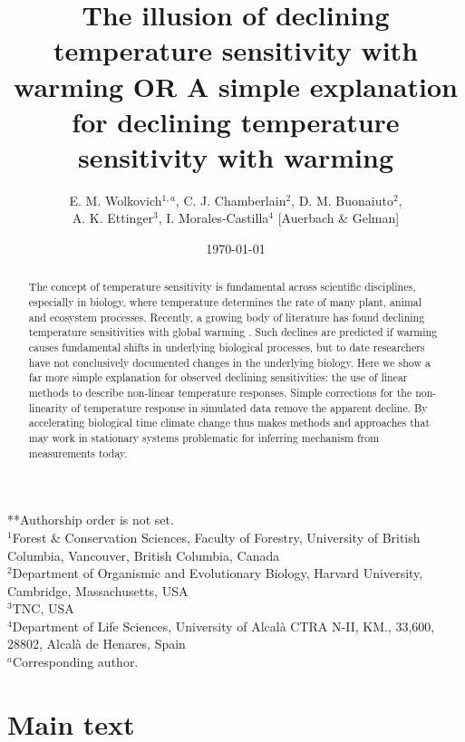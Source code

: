 \documentclass[11pt,letter]{article}
\begin{document}
\title{The illusion of declining temperature sensitivity with warming OR A simple explanation for declining temperature sensitivity with warming} %
\author{E. M. Wolkovich$^{1,a}$, C. J. Chamberlain$^{2}$, D. M. Buonaiuto$^{2}$, \\ A. K. Ettinger$^3$, I. Morales-Castilla$^{4}$ [Auerbach \& Gelman]} %

\date{\today} 
\maketitle
**Authorship order is not set.\\
$^1$Forest \& Conservation Sciences, Faculty of Forestry, University of British Columbia, Vancouver, British Columbia, Canada\\
$^2$Department of Organismic and Evolutionary Biology, Harvard University, Cambridge, Massachusetts, USA\\
$^3$TNC, USA\\
$^4$Department of Life Sciences, University of Alcal\`a CTRA N-II, KM., 33,600, 28802, Alcal\`a de Henares, Spain\\
$^a$Corresponding author.

\section{Main text}
\begin{abstract}
The concept of temperature sensitivity is fundamental across scientific disciplines, especially in biology, where temperature determines the rate of many plant, animal and ecosystem processes. Recently, a growing body of literature has found declining temperature sensitivities with global warming \citep{fu2015,gusewell2017,dai2019ag}. Such declines are predicted if warming causes fundamental shifts in underlying biological processes, but to date researchers have not conclusively documented changes in the underlying biology. Here we show a far more simple explanation for observed declining sensitivities: the use of linear methods to describe non-linear temperature responses. Simple corrections for the non-linearity of temperature response in simulated data remove the apparent decline. By accelerating biological time climate change thus makes methods and approaches that may work in stationary systems problematic for inferring mechanism from measurements today.
\end{abstract}
\end{document}
